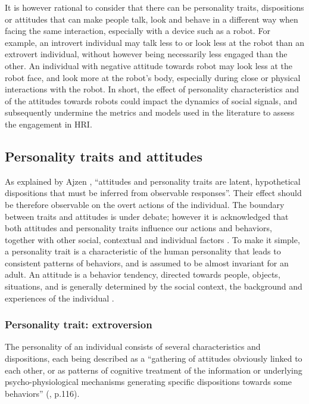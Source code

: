 \documentclass[twocolumn]{svjour3}          %
\begin{document}
It is however rational to consider that there can be personality traits, dispositions or attitudes that can make people talk, look and behave in a different way when facing the same interaction, especially with a device such as a robot.
For example, an introvert individual may talk less to or look less at the robot than an extrovert individual, without however being necessarily less engaged than the other. 
An individual with negative attitude towards robot may look less at the robot face, and look more at the robot's body, especially during close or physical interactions with the robot.
In short, the effect of  personality characteristics and of the attitudes towards robots could impact the dynamics of social signals, and subsequently undermine the metrics and models used in the literature to assess the engagement in HRI.


\subsection{Personality traits and attitudes}


As explained by Ajzen \cite{Ajzen1986}, ``attitudes and personality traits are latent, hypothetical dispositions that must be inferred from observable responses''. Their effect should be therefore observable on the overt actions of the individual.
The boundary between traits and attitudes is under debate; however it is acknowledged that both attitudes and personality traits influence our actions and behaviors, together with other social, contextual and individual factors \cite{Scherer1981}.
To make it simple, a personality trait is a characteristic of the human personality that leads to consistent patterns of behaviors, and is assumed to be almost invariant for an adult.
An attitude is a behavior tendency, directed towards people, objects, situations, and is generally determined by the social context, the background and experiences of the individual \cite{Wood2000}.



\subsubsection{Personality trait: extroversion}


The personality of an individual consists of several characteristics and dispositions, each  being described as a ``gathering of attitudes obviously linked to each other, or as patterns of cognitive treatment of the information or underlying psycho-physiological mechanisms generating specific dispositions towards some behaviors'' (\cite{Scherer1981}, p.116).
\end{document}
